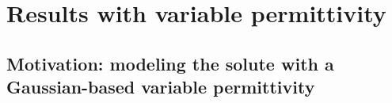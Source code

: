 




\section*{\sffamily \Large Results with variable permittivity}

\subsection*{\sffamily \large Motivation: modeling the solute with a Gaussian-based variable permittivity}

